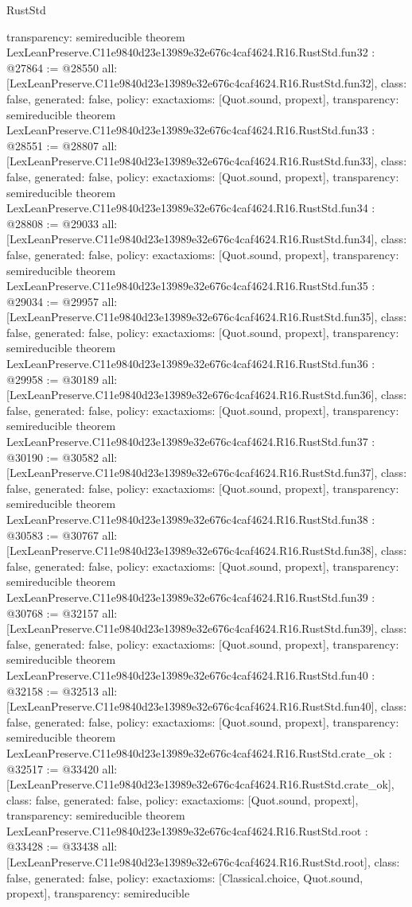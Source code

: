 \begin{lexlean}{RustStd}
\begin{coremodule}
{  transparency: semireducible
}
theorem LexLeanPreserve.C11e9840d23e13989e32e676c4caf4624.R16.RustStd.fun32 : @27864 := @28550 {
  all: [LexLeanPreserve.C11e9840d23e13989e32e676c4caf4624.R16.RustStd.fun32],
  class: false,
  generated: false,
  policy: exact{axioms: [Quot.sound, propext]},
  transparency: semireducible
}
theorem LexLeanPreserve.C11e9840d23e13989e32e676c4caf4624.R16.RustStd.fun33 : @28551 := @28807 {
  all: [LexLeanPreserve.C11e9840d23e13989e32e676c4caf4624.R16.RustStd.fun33],
  class: false,
  generated: false,
  policy: exact{axioms: [Quot.sound, propext]},
  transparency: semireducible
}
theorem LexLeanPreserve.C11e9840d23e13989e32e676c4caf4624.R16.RustStd.fun34 : @28808 := @29033 {
  all: [LexLeanPreserve.C11e9840d23e13989e32e676c4caf4624.R16.RustStd.fun34],
  class: false,
  generated: false,
  policy: exact{axioms: [Quot.sound, propext]},
  transparency: semireducible
}
theorem LexLeanPreserve.C11e9840d23e13989e32e676c4caf4624.R16.RustStd.fun35 : @29034 := @29957 {
  all: [LexLeanPreserve.C11e9840d23e13989e32e676c4caf4624.R16.RustStd.fun35],
  class: false,
  generated: false,
  policy: exact{axioms: [Quot.sound, propext]},
  transparency: semireducible
}
theorem LexLeanPreserve.C11e9840d23e13989e32e676c4caf4624.R16.RustStd.fun36 : @29958 := @30189 {
  all: [LexLeanPreserve.C11e9840d23e13989e32e676c4caf4624.R16.RustStd.fun36],
  class: false,
  generated: false,
  policy: exact{axioms: [Quot.sound, propext]},
  transparency: semireducible
}
theorem LexLeanPreserve.C11e9840d23e13989e32e676c4caf4624.R16.RustStd.fun37 : @30190 := @30582 {
  all: [LexLeanPreserve.C11e9840d23e13989e32e676c4caf4624.R16.RustStd.fun37],
  class: false,
  generated: false,
  policy: exact{axioms: [Quot.sound, propext]},
  transparency: semireducible
}
theorem LexLeanPreserve.C11e9840d23e13989e32e676c4caf4624.R16.RustStd.fun38 : @30583 := @30767 {
  all: [LexLeanPreserve.C11e9840d23e13989e32e676c4caf4624.R16.RustStd.fun38],
  class: false,
  generated: false,
  policy: exact{axioms: [Quot.sound, propext]},
  transparency: semireducible
}
theorem LexLeanPreserve.C11e9840d23e13989e32e676c4caf4624.R16.RustStd.fun39 : @30768 := @32157 {
  all: [LexLeanPreserve.C11e9840d23e13989e32e676c4caf4624.R16.RustStd.fun39],
  class: false,
  generated: false,
  policy: exact{axioms: [Quot.sound, propext]},
  transparency: semireducible
}
theorem LexLeanPreserve.C11e9840d23e13989e32e676c4caf4624.R16.RustStd.fun40 : @32158 := @32513 {
  all: [LexLeanPreserve.C11e9840d23e13989e32e676c4caf4624.R16.RustStd.fun40],
  class: false,
  generated: false,
  policy: exact{axioms: [Quot.sound, propext]},
  transparency: semireducible
}
theorem LexLeanPreserve.C11e9840d23e13989e32e676c4caf4624.R16.RustStd.crate_ok : @32517 := @33420 {
  all: [LexLeanPreserve.C11e9840d23e13989e32e676c4caf4624.R16.RustStd.crate_ok],
  class: false,
  generated: false,
  policy: exact{axioms: [Quot.sound, propext]},
  transparency: semireducible
}
theorem LexLeanPreserve.C11e9840d23e13989e32e676c4caf4624.R16.RustStd.root : @33428 := @33438 {
  all: [LexLeanPreserve.C11e9840d23e13989e32e676c4caf4624.R16.RustStd.root],
  class: false,
  generated: false,
  policy: exact{axioms: [Classical.choice, Quot.sound, propext]},
  transparency: semireducible
}


\end{coremodule}
\end{lexlean}
